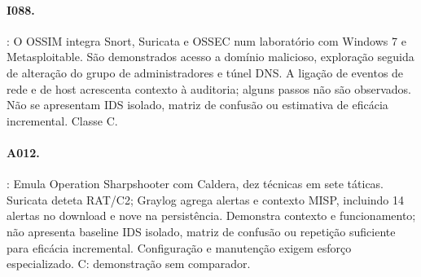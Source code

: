 \documentclass[11pt,a4paper]{article}
\begin{document}
\paragraph{I088.} \citet{ossimaudit2015}: O OSSIM integra Snort, Suricata e OSSEC num laboratório com Windows 7 e Metasploitable. São demonstrados acesso a domínio malicioso, exploração seguida de alteração do grupo de administradores e túnel DNS. A ligação de eventos de rede e de host acrescenta contexto à auditoria; alguns passos não são observados. Não se apresentam IDS isolado, matriz de confusão ou estimativa de eficácia incremental. Classe C.

\paragraph{A012.} \citet{ctismes2025}: Emula Operation Sharpshooter com Caldera, dez técnicas em sete táticas. Suricata deteta RAT/C2; Graylog agrega alertas e contexto MISP, incluindo 14 alertas no download e nove na persistência. Demonstra contexto e funcionamento; não apresenta baseline IDS isolado, matriz de confusão ou repetição suficiente para eficácia incremental. Configuração e manutenção exigem esforço especializado. C: demonstração sem comparador.
\end{document}
